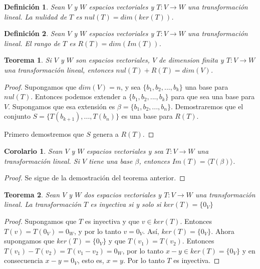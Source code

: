 \documentclass{book}
\newtheorem{theorem}{Teorema}
\newtheorem{definition}{Definición}
\newtheorem{corollary}{Corolario}
\begin{document}
\begin{definition}
Sean $V$ y $W$ espacios vectoriales y $T:V\rightarrow W$ una transformación lineal. La nulidad de $T$ es $nul(T)=dim(ker(T))$.
\end{definition}

\begin{definition}
Sean $V$ y $W$ espacios vectoriales y $T:V\rightarrow W$ una transformación lineal. El rango de $T$ es $R(T)=dim(Im(T))$.
\end{definition}

\begin{theorem}
Si $V$ y $W$ son espacios vectoriales, $V$ de dimension finita y $T:V\rightarrow W$ una transformación lineal, entonces $nul(T)+R(T)=dim(V)$.
\end{theorem}

\begin{proof}
Supongamos que $dim(V)=n$, y sea $\{b_1,b_2,...,b_k\}$ una base para $nul(T)$. Entonces podemos extender a $\{b_1,b_2,...,b_k\}$ para que sea una base para $V$. Supongamos que esa extensión es $\beta=\{b_1,b_2,...,b_n\}$. Demostraremos que el conjunto $S=\{T(b_{k+1}),...,T(b_n)\}$ es una base para $R(T)$.

Primero demostremos que $S$ genera a $R(T)$. 
\end{proof}

\begin{corollary}
Sean $V$ y $W$ espacios vectoriales y sea $T:V\rightarrow W$ una transformación lineal. Si $V$ tiene una base $\beta$, entonces $Im(T)=\langle T(\beta)\rangle$.
\end{corollary}

\begin{proof}
Se sigue de la demostración del teorema anterior. 
\end{proof}

\begin{theorem}
Sean $V$ y $W$ dos espacios vectoriales y $T:V\rightarrow W$ una transformación lineal. La transformación $T$ es inyectiva si y solo si $ker(T)=\{0_V\}$
\end{theorem}

\begin{proof}
Supongamos que $T$ es inyectiva y que $v\in ker(T)$. Entonces $T(v)=T(0_V)=0_W$, y por lo tanto $v=0_V$. Así, $ker(T)=\{0_V\}$. Ahora supongamos que $ker(T)=\{0_V\}$ y que $T(v_1)=T(v_2)$. Entonces $T(v_1)-T(v_2)=T(v_1-v_2)=0_W$, por lo tanto $x-y\in ker(T)=\{0_V\}$ y en consecuencia $x-y=0_V$, esto es, $x=y$. Por lo tanto $T$ es inyectiva.
\end{proof}
\end{document}
